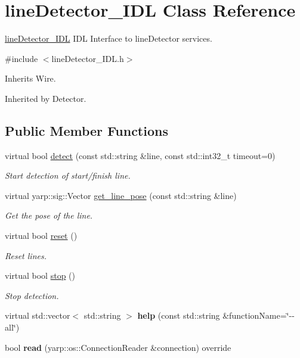 \section{line\+Detector\+\_\+\+I\+DL Class Reference}
\label{classlineDetector__IDL}


\hyperlink{classlineDetector__IDL}{line\+Detector\+\_\+\+I\+DL} I\+DL Interface to line\+Detector services.  




{\ttfamily \#include $<$line\+Detector\+\_\+\+I\+D\+L.\+h$>$}



Inherits Wire.



Inherited by Detector.

\subsection*{Public Member Functions}
\begin{DoxyCompactItemize}
\item 
virtual bool \hyperlink{classlineDetector__IDL_a393124f2e4ea02a0ef2d4ba4df5d73c0}{detect} (const std\+::string \&line, const std\+::int32\+\_\+t timeout=0)
\begin{DoxyCompactList}\small\item\em Start detection of start/finish line. \end{DoxyCompactList}\item 
virtual yarp\+::sig\+::\+Vector \hyperlink{classlineDetector__IDL_a6684bf72680108e8b5db2a6b48e6e504}{get\+\_\+line\+\_\+pose} (const std\+::string \&line)
\begin{DoxyCompactList}\small\item\em Get the pose of the line. \end{DoxyCompactList}\item 
virtual bool \hyperlink{classlineDetector__IDL_a665153eb57fa761fe6dd9ae741169f7b}{reset} ()
\begin{DoxyCompactList}\small\item\em Reset lines. \end{DoxyCompactList}\item 
virtual bool \hyperlink{classlineDetector__IDL_ab2905809969a72d0d835b9ea685150ba}{stop} ()
\begin{DoxyCompactList}\small\item\em Stop detection. \end{DoxyCompactList}\item 
\mbox{\label{classlineDetector__IDL_ac0e08d7eaab969b6d38519abd4118923}} 
virtual std\+::vector$<$ std\+::string $>$ {\bfseries help} (const std\+::string \&function\+Name=\char`\"{}-\/-\/all\char`\"{})
\item 
\mbox{\label{classlineDetector__IDL_a0ae07f2cb8270fc30b5358f4ba1e9796}} 
bool {\bfseries read} (yarp\+::os\+::\+Connection\+Reader \&connection) override
\end{DoxyCompactItemize}


